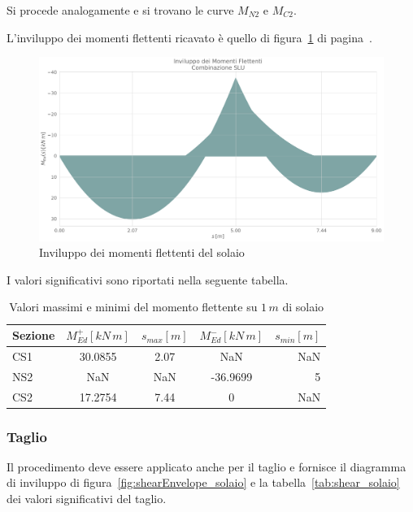 Si procede analogamente e si trovano le curve $M_{N2}$ e $M_{C2}$.

L'inviluppo dei momenti flettenti ricavato è quello di figura~\ref{fig:bendingMomentEnvelope_solaio} di pagina~\pageref{fig:bendingMomentEnvelope_solaio}.

\begin{figure}
	\centering
	\includegraphics[width=\textwidth]{../../export/img/bendingMomentEnvelopeSolaio_slu}
	\caption{Inviluppo dei momenti flettenti del solaio}
	\label{fig:bendingMomentEnvelope_solaio}
\end{figure}

I valori significativi sono riportati nella seguente tabella.

\begin{table}[ht!]
	\centering
	\caption{Valori massimi e minimi del momento flettente su $1\,m$ di solaio}
	\label{tab:bendingMoment_solaio}
    \begin{tabular*}{\textwidth}{l @{\extracolsep{\fill}} cccr}
\toprule
Sezione &  $M_{Ed}^+ [kN\,m]$ &  $s_{max} [m]$ &  $M_{Ed}^- [kN\,m]$ &  $s_{min} [m] $\\
\midrule
CS1      &     30.0855 &     2.07 &         NaN &      NaN \\
NS2      &         NaN &      NaN &    -36.9699 &        5 \\
CS2      &     17.2754 &     7.44 &           0 &      NaN \\
\bottomrule
    \end{tabular*}
\end{table}

\subsubsection*{Taglio}

Il procedimento deve essere applicato anche per il taglio e fornisce il diagramma di inviluppo di figura~\ref{fig:shearEnvelope_solaio} e la tabella~\ref{tab:shear_solaio} dei valori significativi del taglio.

